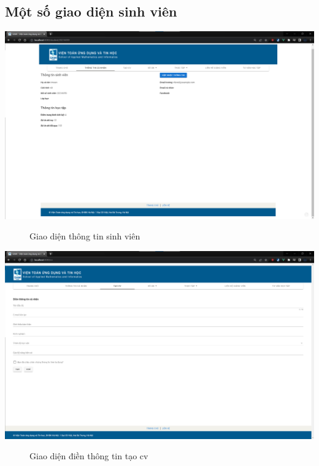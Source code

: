   \subsection*{Một số giao diện sinh viên}
    \begin{center}
      \includegraphics[width=.95\textwidth]{./image/design/student/info.png}
      \begin{figure}[h]
        \centering
        \caption{Giao diện thông tin sinh viên}
      \end{figure}
    \end{center}
    \begin{center}
      \includegraphics[width=1\textwidth]{./image/design/student/cv.png}
      \begin{figure}[h]
        \centering
        \caption{Giao diện điền thông tin tạo cv}
      \end{figure}
    \end{center}
